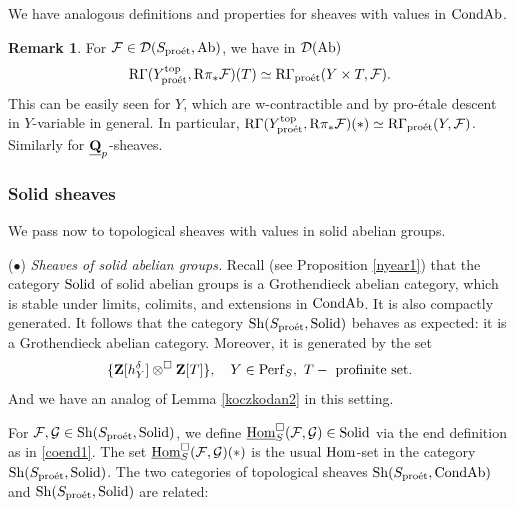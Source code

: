 \documentclass[10pt]{amsart}
\theoremstyle{definition}
\newtheorem{remark}[equation]{Remark}
\theoremstyle{remark}
\newcommand{\proeet}{\operatorname{pro\acute{e}t} }
\newcommand{\Hom}{{\rm{Hom}} }
\newcommand{\uHom}{\underline{{\rm{Hom}} }}
\newcommand{\sff}{{\mathcal{F}}}
\newcommand{\sg}{{\mathcal{G}}}
\newcommand{\sd}{{\mathcal{D}}}
\numberwithin{equation}{section}
\def\R{{\mathrm R}}
\def\Q{{\bf Q}} \def\Z{{\bf Z}}
\numberwithin{equation}{section}
\begin{document}
 We have analogous  definitions and properties for sheaves with values in ${\rm CondAb}$. 
 
\begin{remark}   
For $\sff\in  \sd(S_{\proeet},{\rm Ab})$,   we have in $\sd(\rm Ab)$
$$
\R\Gamma(Y^{\rm top}_{\proeet},\R\pi_*\sff)(T)\simeq \R\Gamma_{\proeet}(Y\times T,\sff).
$$
This can be easily seen for $Y$, which are w-contractible and by pro-\'etale descent in $Y$-variable in general. 
In particular, $\R\Gamma(Y^{\rm top}_{\proeet},\R\pi_*\sff)(*)\simeq \R\Gamma_{\proeet}(Y,\sff)$. Similarly for $\underline{\Q}_p$-sheaves.
\end{remark}
\subsubsection{Solid sheaves} \label{solid1} We pass now to topological sheaves with values in solid abelian groups. 

  \vskip2mm
   ($\bullet$) {\em Sheaves of solid  abelian groups.} Recall (see Proposition \ref{nyear1}) that the category ${\rm Solid}$ of solid abelian groups is a Grothendieck abelian category, which is stable under limits, colimits, and extensions in ${\rm CondAb}$. It is also compactly generated.  It follows that  the category
${\rm Sh}(S_{\proeet},{\rm Solid})$ behaves as expected: it is a Grothendieck abelian category.  Moreover, it is generated by the set 
\begin{equation}\label{koczkodan4}
\{\Z[h^{\delta}_Y]\otimes^{\Box}\Z[T]\}, \quad Y\in {\rm Perf}_S,\  T - \mbox{ profinite set}.
\end{equation}
And we have an analog of Lemma \ref{koczkodan2} in this setting. 

  For $\sff,\sg\in  {\rm Sh}(S_{\proeet},{\rm Solid})$, we define $\uHom^{\Box}_{S}(\sff,\sg)\in {\rm Solid}$ via  the  end definition as in \eqref{coend1}. The set  $\uHom^{\Box}_{S}(\sff,\sg)(*)$ is the usual $\Hom$-set
  in the category $ {\rm Sh}(S_{\proeet},{\rm Solid})$.  The two categories of topological sheaves ${\rm Sh}(S_{\proeet},{\rm CondAb})$ and $ {\rm Sh}(S_{\proeet},{\rm Solid})$  are related: 
\end{document}
